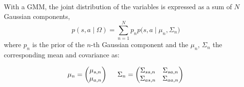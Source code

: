 With a GMM, the joint distribution of the variables is expressed as a sum of $N$ Gaussian components,
\begin{equation}
{
p(s,a\mid\Omega)
= \sum_{n=1}^N {p_{n}p(s,a\mid{\mu}_n},{\Sigma}_n)
}
\end{equation}
where $p_n$ is the prior of the $n$-th Gaussian component and the ${\mu}_n$, ${\Sigma}_n$ the corresponding mean and covariance as:

\begin{equation}
{
{\mu}_n = \begin{pmatrix}    {\mu}_{s,n}     \\
                             {\mu}_{a,n}          \\
                    \end{pmatrix}
\hspace{0.2in}
{\Sigma}_n = \begin{pmatrix}     {\Sigma}_{ss,n}  &
                                 {\Sigma}_{sa,n} \\
                                 {\Sigma}_{as,n}  &
                                 {\Sigma}_{aa,n}   \\

                        \end{pmatrix}
}
\end{equation}




